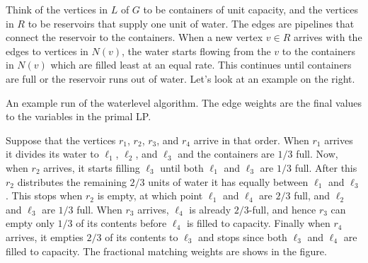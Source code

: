 Think of the vertices in $L$ of $G$ to be containers of unit capacity, and the
vertices in $R$ to be reservoirs that supply one unit of water. The edges are
pipelines that connect the reservoir to the containers. When a new vertex
$v\in R$ arrives with the edges to vertices in $N(v)$, the water starts flowing
from the $v$ to the containers in $N(v)$ which are filled least at an equal
rate. This continues until containers are full or the reservoir runs out of
water. Let's look at an example on the right.
\begin{marginfigure}
  \centering
  \caption{An example run of the waterlevel algorithm. The edge weights are the
    final values to the variables in the primal LP.}
  \label{fig:waterlevel-algo}
\end{marginfigure}
Suppose that the vertices $r_1$, $r_2$, $r_3$, and $r_4$ arrive in that
order. When $r_1$ arrives it divides its water to $\ell_1$, $\ell_2$, and
$\ell_3$ and the containers are $1/3$ full. Now, when $r_2$ arrives, it starts
filling $\ell_3$ until both $\ell_1$ and $\ell_3$ are $1/3$ full. After this
$r_2$ distributes the remaining $2/3$ units of water it has equally between
$\ell_1$ and $\ell_3$. This stops when $r_2$ is empty, at which point $\ell_1$
and $\ell_4$ are $2/3$ full, and $\ell_2$ and $\ell_3$ are $1/3$ full. When
$r_3$ arrives, $\ell_4$ is already $2/3$-full, and hence $r_3$ can empty only
$1/3$ of its contents before $\ell_4$ is filled to capacity. Finally when $r_4$
arrives, it empties $2/3$ of its contents to $\ell_3$ and stops since both
$\ell_3$ and $\ell_4$ are filled to capacity. The fractional matching weights
are shows in the figure.

